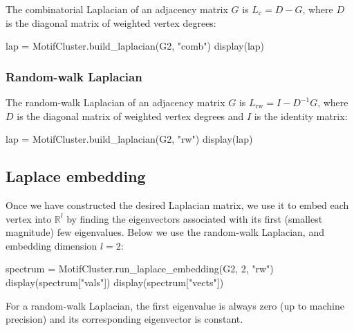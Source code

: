 \documentclass{article}
\begin{document}
The combinatorial Laplacian of an adjacency matrix $G$ is
$L_\mathrm{c} = D - G$,
where $D$ is the diagonal matrix of weighted vertex degrees:

\begin{tcolorbox}[colback=black!5!white,colframe=black!15!white]
\begin{juliablock}
lap = MotifCluster.build_laplacian(G2, "comb")
display(lap)
\end{juliablock}
\texttt{\obeylines\printpythontex}
\end{tcolorbox}

\subsubsection{Random-walk Laplacian}

The random-walk Laplacian of an adjacency matrix $G$ is
$L_\mathrm{rw} = I - D^{-1}G$,
where $D$ is the diagonal matrix of weighted vertex degrees
and $I$ is the identity matrix:

\begin{tcolorbox}[colback=black!5!white,colframe=black!15!white]
\begin{juliablock}
lap = MotifCluster.build_laplacian(G2, "rw")
display(lap)
\end{juliablock}
\texttt{\obeylines\printpythontex}
\end{tcolorbox}

\subsection{Laplace embedding}

Once we have constructed the desired Laplacian matrix,
we use it to embed each vertex into $\mathbb{R}^l$
by finding the eigenvectors associated with
its first (smallest magnitude) few eigenvalues.
Below we use the random-walk Laplacian,
and embedding dimension $l=2$:

\begin{tcolorbox}[colback=black!5!white,colframe=black!15!white]
\begin{juliablock}
spectrum = MotifCluster.run_laplace_embedding(G2, 2, "rw")
display(spectrum["vals"])
display(spectrum["vects"])
\end{juliablock}
\texttt{\obeylines\printpythontex}
\end{tcolorbox}

For a random-walk Laplacian,
the first eigenvalue is always zero (up to machine precision)
and its corresponding eigenvector is constant.
\end{document}
